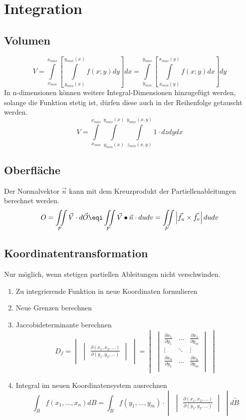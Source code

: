 \section{Integration}

\subsection{Volumen}
\[
V = \int\limits_{x_{min}}^{x_{max}}\left[\int\limits_{y_{min}(x)}^{y_{max}(x)}f(x;y)dy\right]dx= \int\limits_{y_{min}}^{y_{max}}\left[\int\limits_{x_{min}(y)}^{x_{max}(y)}f(x;y)dx\right]dy
\]
In n-dimensionen können weitere Integral-Dimensionen hinzugefügt werden, solange die Funktion stetig ist, dürfen diese auch in der Reihenfolge getauscht werden.
\[
V = \int\limits_{x_{min}}^{x_{max}}\int\limits_{y_{min}(x)}^{y_{max}(x)}\int\limits_{z_{min}(x,y)}^{y_{max}(x,y)}1\cdot dzdydx
\]

\subsection{Oberfläche}
Der Normalvektor $\vec{n}$ kann mit dem Kreuzprodukt der Partiellenableitungen berechnet werden.
\[
O = \iint\limits_F \vec{V}\cdot d\vec{O} \eqi \iint\limits_{F}\vec{V}\bullet \vec{n} \cdot du dv = \iint\limits_{F}\left|\vec{f}_u \times \vec{f}_v\right|dudv
\]

\subsection{Koordinatentransformation}
Nur möglich, wenn stetigen partiellen Ableitungen nicht verschwinden.
\begin{enumerate}[nosep]
	\item Zu integrierende Funktion in neue Koordinaten formulieren
	\item Neue Grenzen berechnen
	\item Jaccobideterminante berechnen
	\[ D_f= 
	\begin{vmatrix}\begin{vmatrix}
		\frac{\partial(x_1,x_2,\dots)}{\partial(y_1,y_2,\dots)}
	\end{vmatrix}	\end{vmatrix} = 	\begin{vmatrix}\begin{vmatrix}
	\frac{\partial x_1}{\partial y_1} & \dots & \frac{\partial x_1}{\partial y_m} \\
	\vdots & \ddots & \vdots\\
	\frac{\partial x_n}{\partial y_1} & \dots & \frac{\partial x_n}{\partial y_m} \\
\end{vmatrix}	\end{vmatrix}
	\]
	\item Integral im neuen Koordinatensystem ausrechnen
	\[
	\int_{B}f(x_1,\dots,x_n)dB = \int_{\tilde{B}}f(y_1,\dots,y_m)\cdot	\begin{vmatrix}\begin{vmatrix}
			\frac{\partial(x_1,x_2,\dots)}{\partial(y_1,y_2,\dots)}
	\end{vmatrix}	\end{vmatrix}d\tilde{B}
	\]
\end{enumerate}


